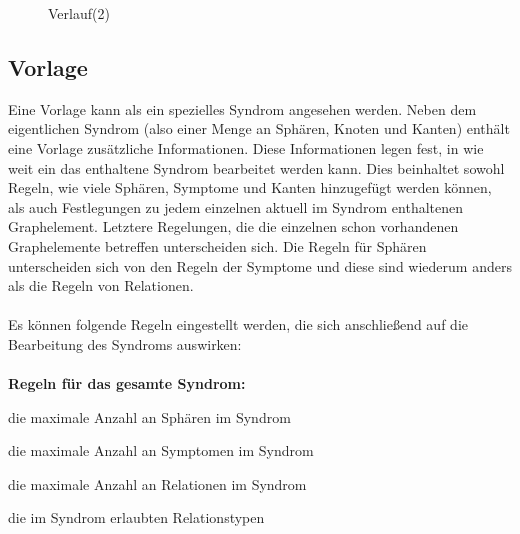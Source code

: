 \documentclass[enabledeprecatedfontcommands,fontsize=11pt,paper=a4,twoside]{scrartcl}
\newcommand*{\bbe}{\textcolor{bbe}}
\newcounter{one}
\let\origenumerate\enumerate
\let\origendenumerate\endenumerate
\renewenvironment{enumerate}{\origenumerate \addtolength{\itemsep}{-10.0pt}}{\origendenumerate}
\begin{document}
	\begin{figure}[ht!]
		\centering
		\caption{Verlauf(2)}
	
	\end{figure}
		

\newpage
\subsection{Vorlage} \label{template}
Eine Vorlage kann als ein spezielles Syndrom angesehen werden. Neben dem eigentlichen Syndrom (also einer Menge an Sphären, Knoten und Kanten) enthält eine Vorlage zusätzliche Informationen. Diese Informationen legen fest, in wie weit ein das enthaltene Syndrom bearbeitet werden kann. Dies beinhaltet sowohl Regeln, wie viele Sphären, Symptome und Kanten hinzugefügt werden können, als auch Festlegungen zu jedem einzelnen aktuell im Syndrom enthaltenen Graphelement. Letztere Regelungen, die die einzelnen schon vorhandenen Graphelemente betreffen unterscheiden sich. Die Regeln für Sphären unterscheiden sich von den Regeln der Symptome und diese sind wiederum anders als die Regeln von Relationen. \\ \\
Es können folgende Regeln eingestellt werden, die sich anschließend auf die Bearbeitung des Syndroms auswirken: \\ \\
\textbf{\bbe{Regeln für das gesamte Syndrom:}}
\begin{enumerate}
	\item die maximale Anzahl an Sphären im Syndrom
	\item die maximale Anzahl an Symptomen im Syndrom 
	\item die maximale Anzahl an Relationen im Syndrom
	\item die im Syndrom erlaubten Relationstypen
\end{enumerate}
\end{document}
